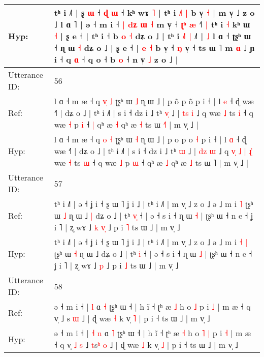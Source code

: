 \documentclass[10pt]{article}
\DeclareRobustCommand{\hl}[1]{{\textcolor{red}{#1}}}
\begin{document}
\begin{longtable}{ll}
 \\
Hyp: & tʰ i ˩˥ | ʂ \hl{ɯ} ˧ \hl{}\hl{ɖ} \hl{}\hl{ɯ} ˧ kʰ wɤ \hl{˥} | tʰ i\hl{ }\hl{˩}\hl{˥} \hl{|} b v̩ \hl{˧} | m v̩ ˩ z o ˩ l ɑ ˥ | ə ˧ m i ˧ \hl{|}\hl{ }\hl{d}\hl{ʑ} \hl{ɯ} \hl{˧} m v̩ ˧ \hl{}\hl{ʈ}\hl{ʰ} \hl{æ} ˧\hl{}\hl{˥} \hl{|} tʰ i \hl{˧} kʰ ɯ \hl{˧} | ʂ e ˧ | tʰ i ˧ b\hl{}\hl{}\hl{} \hl{o} \hl{˧} dʑ o ˩ | tʰ i\hl{ }\hl{˩}\hl{˥}\hl{ }\hl{|} ˩˥ | \hl{˩} l ɑ ˧ ʈʂʰ ɯ ˧ ɳ ɯ \hl{˧} dʑ o ˩ | ʂ e ˧ | \hl{}\hl{e}\hl{ }\hl{˧} b v̩ ˧ \hl{ŋ} v̩ ˧ ts ɯ ˥\hl{}\hl{} m \hl{}\hl{ɑ} ˩\hl{}\hl{} ɲ i ˧ q\hl{} \hl{}\hl{ɑ} ˧ q o ˧\hl{}\hl{} b \hl{}\hl{o} ˧ n v̩ \hl{˩} z o ˩ |
 \\
\midrule
Utterance ID: & 56 \\
Ref: & l ɑ ˧ m æ ˧ q \hl{v}\hl{̩} \hl{˩} ʈʂʰ ɯ \hl{˩} ɳ ɯ ˩ | p o\hl{̃} p o\hl{}\hl{̃} p i ˧ | l \hl{e} ˧ ɖ wæ ˧˥ | dʑ o ˩ | tʰ i ˩˥ | s i ˧ dz i ˩ tʰ \hl{v}\hl{̩} ˩ | \hl{t}\hl{s} \hl{i} ˩ q\hl{}\hl{}\hl{}\hl{}\hl{}\hl{}\hl{}\hl{}\hl{}\hl{} wæ \hl{˩} ts \hl{i} ˧ q wæ \hl{˧} p \hl{i} ˧\hl{ }\hl{|} qʰ æ \hl{˧} qʰ æ \hl{˧} ts ɯ \hl{˧}˥ | m v̩ ˩ |
 \\
Hyp: & l ɑ ˧ m æ ˧ q \hl{}\hl{o} \hl{˧} ʈʂʰ ɯ \hl{˧} ɳ ɯ ˩ | p o\hl{} p o\hl{ }\hl{˧} p i ˧ | l \hl{ɑ} ˧ ɖ wæ ˧˥ | dʑ o ˩ | tʰ i ˩˥ | s i ˧ dz i ˩ tʰ \hl{}\hl{ɯ} ˩ | \hl{d}\hl{z} \hl{ɯ} ˩ q\hl{ }\hl{v}\hl{̩}\hl{ }\hl{˩}\hl{ }\hl{|}\hl{ }\hl{ɻ}\hl{̍} wæ \hl{˧} ts \hl{ɯ} ˧ q wæ \hl{˩} p \hl{ɯ} ˧\hl{}\hl{} qʰ æ \hl{˩} qʰ æ \hl{˩} ts ɯ \hl{}˥ | m v̩ ˩ |
 \\
\midrule
Utterance ID: & 57 \\
Ref: & tʰ i ˩˥ | ə ˧ ʝ i ˧ ʂ ɯ ˥ ʝ i ˩ | tʰ i ˩˥ | m v̩ ˩ z o ˩ ə ˩ m i\hl{}\hl{} \hl{˥} ʈʂʰ ɯ \hl{˩} ɳ ɯ ˩\hl{ }\hl{|} dʑ o ˩ | tʰ \hl{v}\hl{̩} ˧ | ə ˧ s i ˧ ɳ ɯ \hl{˧} | ʈʂʰ ɯ ˧ n e ˧ ʝ i ˥ | ʐ wɤ ˩\hl{ }\hl{k} \hl{v}\hl{̩} ˩ p i \hl{˥} ts ɯ ˩ | m v̩ ˩
 \\
Hyp: & tʰ i ˩˥ | ə ˧ ʝ i ˧ ʂ ɯ ˥ ʝ i ˩ | tʰ i ˩˥ | m v̩ ˩ z o ˩ ə ˩ m i\hl{ }\hl{˧} \hl{|} ʈʂʰ ɯ \hl{˧} ɳ ɯ ˩\hl{}\hl{} dʑ o ˩ | tʰ \hl{}\hl{i} ˧ | ə ˧ s i ˧ ɳ ɯ \hl{˩} | ʈʂʰ ɯ ˧ n e ˧ ʝ i ˥ | ʐ wɤ ˩\hl{}\hl{} \hl{}\hl{p} ˩ p i \hl{˩} ts ɯ ˩ | m v̩ ˩
 \\
\midrule
Utterance ID: & 58 \\
Ref: & ə ˧ m i ˧ |\hl{}\hl{} \hl{l} ɑ \hl{˧} ʈʂʰ ɯ ˧ | h ĩ ˧ ʈʰ æ \hl{˩} h o\hl{}\hl{} \hl{˩} p i \hl{˩} | m æ ˧ q v̩\hl{}\hl{}\hl{}\hl{} ˩ \hl{}s\hl{} \hl{ɯ} ˩ | ɖ wæ \hl{˧} k v̩ \hl{˥} | p i ˧ ts ɯ ˩ | m v̩ ˩
 \\
Hyp: & ə ˧ m i ˧ |\hl{ }\hl{˧} \hl{n} ɑ \hl{˥} ʈʂʰ ɯ ˧ | h ĩ ˧ ʈʰ æ \hl{˧} h o\hl{ }\hl{˥} \hl{|} p i \hl{˧} | m æ ˧ q v̩\hl{ }\hl{˩}\hl{ }\hl{s} ˩ \hl{t}s\hl{ʰ} \hl{o} ˩ | ɖ wæ \hl{˩} k v̩ \hl{˩} | p i ˧ ts ɯ ˩ | m v̩ ˩

\end{longtable}
\end{document}
